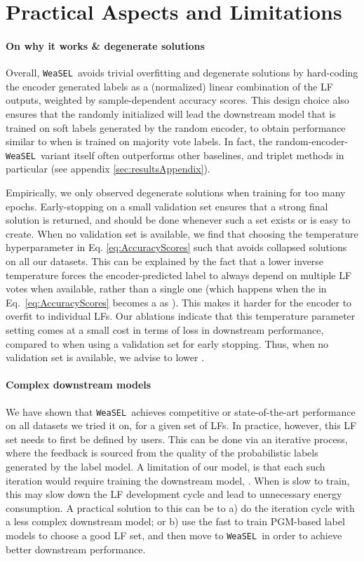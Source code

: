 \documentclass{article}
\newcommand{\weasel}{\texttt{WeaSEL}}\newcommand{\brackets}[1]{\left( #1 \right)}
\begin{document}
 
\section{Practical Aspects and Limitations}
\label{sec:practicalAspects}
\paragraph{On why it works \& degenerate solutions}
Overall, \weasel\ avoids trivial overfitting and degenerate solutions by hard-coding the encoder generated labels as a (normalized) linear combination of the  LF outputs, weighted by  sample-dependent accuracy scores. 
This design choice also ensures that the randomly initialized  will lead the downstream model  that is trained on soft labels generated by the random encoder, to obtain performance similar to when  is trained on majority vote labels. In fact, the random-encoder-\weasel\ variant itself often outperforms other baselines, and triplet methods in particular (see appendix \ref{sec:resultsAppendix}).

Empirically, we only observed degenerate solutions when training for too many epochs. Early-stopping on a small validation set ensures that a strong final solution is returned, and should be done whenever such a set exists or is easy to create. When no validation set is available, we find that choosing the temperature hyperparameter in Eq. \ref{eq:AccuracyScores} such that  avoids collapsed solutions on all our datasets. This can be explained by the fact that a lower inverse temperature forces the encoder-predicted label to always depend on multiple LF votes when available, rather than a single one (which happens when the  in Eq.~\ref{eq:AccuracyScores} becomes a  as ). This makes it harder for the encoder to overfit to individual LFs. Our ablations indicate that this temperature parameter setting comes at a small cost in terms of loss in downstream performance, compared to when using a validation set for early stopping. Thus, when no validation set is available, we advise to lower .

\paragraph{Complex downstream models}
We have shown that \weasel\ achieves competitive or state-of-the-art performance on all datasets we tried it on, for a given set of LFs. In practice, however, this LF set needs to first be defined by users. This can be done via an iterative process, where the feedback is sourced from the quality of the probabilistic labels generated by the label model. A limitation of our model, is that each such iteration would require training the downstream model, . When  is slow to train, this may slow down the LF development cycle and lead to unnecessary energy consumption. A practical solution to this can be to a) do the iteration cycle with a less complex downstream model; or b) use the fast to train PGM-based label models to choose a good LF set, and then move to \weasel\ in order to achieve better downstream performance. 
\end{document}
